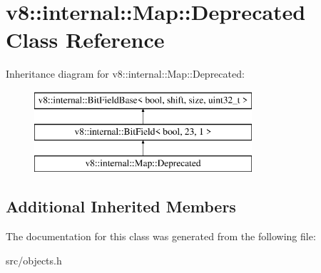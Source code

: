 \hypertarget{classv8_1_1internal_1_1_map_1_1_deprecated}{}\section{v8\+:\+:internal\+:\+:Map\+:\+:Deprecated Class Reference}
\label{classv8_1_1internal_1_1_map_1_1_deprecated}
Inheritance diagram for v8\+:\+:internal\+:\+:Map\+:\+:Deprecated\+:\begin{figure}[H]
\begin{center}
\leavevmode
\includegraphics[height=3.000000cm]{classv8_1_1internal_1_1_map_1_1_deprecated}
\end{center}
\end{figure}
\subsection*{Additional Inherited Members}


The documentation for this class was generated from the following file\+:\begin{DoxyCompactItemize}
\item 
src/objects.\+h\end{DoxyCompactItemize}
